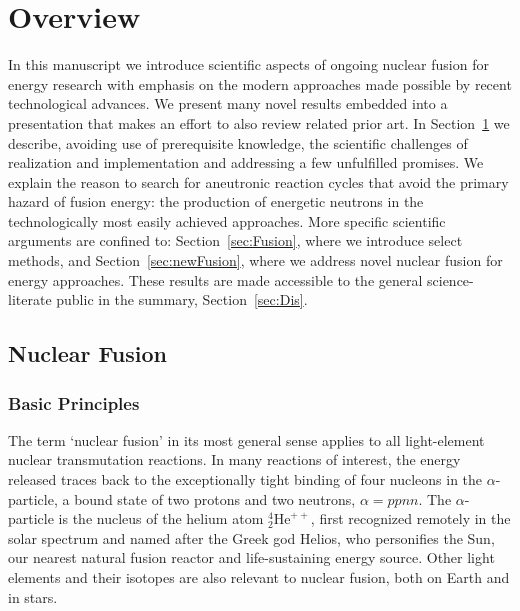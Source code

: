 \documentclass[particles,article,accept,pdftex,moreauthors]{Definitions/mdpi}
\newcommand{\rsec}[1]{Section~\ref{#1}}
\begin{document}
\tableofcontents
\section{Overview}\label{sec:overview}
In this manuscript we introduce scientific aspects of ongoing nuclear fusion for energy research with emphasis on the modern approaches made possible by recent technological advances. We present many novel results embedded into a presentation that makes an effort to also review related prior art. In \rsec{sec:overview} we describe, avoiding use of prerequisite knowledge, the scientific challenges of realization and implementation and addressing a few unfulfilled promises. We explain the reason to search for aneutronic reaction cycles that avoid the primary hazard of fusion energy: the production of energetic neutrons in the technologically most easily achieved approaches. More specific scientific arguments are confined to: \rsec{sec:Fusion}, where we introduce select methods, and \rsec{sec:newFusion}, where we address novel nuclear fusion for energy approaches. These results are made accessible to the general science-literate public in the summary, \rsec{sec:Dis}.
\subsection{Nuclear Fusion}\label{ssec:fusion}


\subsubsection{Basic Principles}\label{sssec:basics}
The term `nuclear fusion' in its most general sense applies to all light-element nuclear transmutation reactions. In many reactions of interest, the energy released traces back to the exceptionally tight binding of four nucleons in the $\alpha$-particle, a bound state of two protons and two neutrons, $\alpha=ppnn$. The $\alpha$-particle is the nucleus of the helium atom ${}^{4\!}_{2\!}\mathrm{He}^{++}$, first recognized remotely in the solar spectrum and named after the Greek god Helios, who personifies the Sun, our nearest natural fusion reactor and life-sustaining energy source. Other light elements and their isotopes are also relevant to nuclear fusion, both on Earth and in stars.
\end{document}

